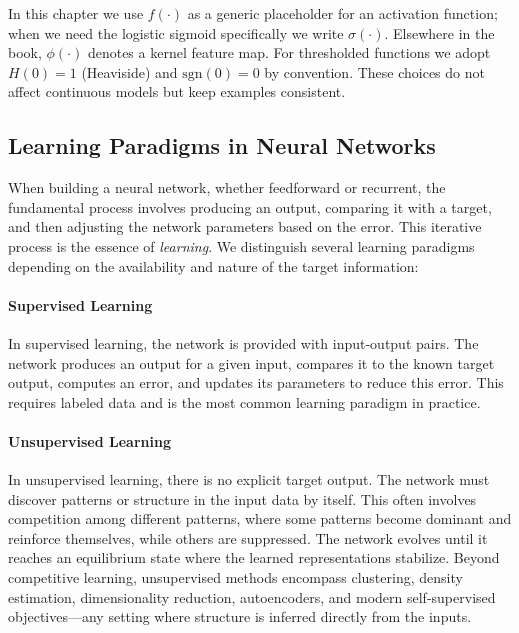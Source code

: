 \begin{tcolorbox}[summarybox, title={Notation note: activations and thresholds}]
In this chapter we use \(f(\cdot)\) as a generic placeholder for an activation function; when we need the logistic sigmoid specifically we write \(\sigma(\cdot)\). Elsewhere in the book, \(\phi(\cdot)\) denotes a kernel feature map. For thresholded functions we adopt \(H(0)=1\) (Heaviside) and \(\mathrm{sgn}(0)=0\) by convention. These choices do not affect continuous models but keep examples consistent.
\end{tcolorbox}

\subsection{Learning Paradigms in Neural Networks}
\label{sec:perceptron_learning_paradigms_in_neural_networks}

When building a neural network, whether feedforward or recurrent, the fundamental process involves producing an output, comparing it with a target, and then adjusting the network parameters based on the error. This iterative process is the essence of \emph{learning}. We distinguish several learning paradigms depending on the availability and nature of the target information:

\paragraph{Supervised Learning}
In supervised learning, the network is provided with input-output pairs. The network produces an output for a given input, compares it to the known target output, computes an error, and updates its parameters to reduce this error. This requires labeled data and is the most common learning paradigm in practice.

\paragraph{Unsupervised Learning}
In unsupervised learning, there is no explicit target output. The network must discover patterns or structure in the input data by itself. This often involves competition among different patterns, where some patterns become dominant and reinforce themselves, while others are suppressed. The network evolves until it reaches an equilibrium state where the learned representations stabilize.
Beyond competitive learning, unsupervised methods encompass clustering, density estimation, dimensionality reduction, autoencoders, and modern self-supervised objectives---any setting where structure is inferred directly from the inputs.

